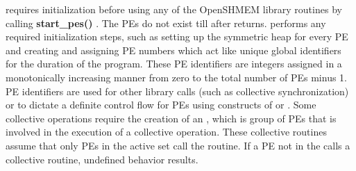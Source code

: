 \openshmem requires initialization before using any of the OpenSHMEM library
routines by calling \textbf{start\_pes()} .%
The \ac{PE}s do not exist till after  returns.  performs any required initialization steps, such as setting up the symmetric heap for every \ac{PE} and creating and assigning \ac{PE} numbers which act like unique global identifiers for the duration of the program. These \ac{PE} identifiers are integers assigned in a monotonically increasing manner from zero to the total number of \ac{PE}s minus 1. \ac{PE} identifiers are used for other \openshmem library calls (such as collective synchronization) or to dictate a definite control flow for \ac{PE}s using constructs of \Clang{} or \Fortran{}. Some collective operations require the creation of an \activeset, which is  group of \ac{PE}s that is involved in the execution of a collective operation. These collective routines assume that only \ac{PE}s in the active set call the routine. If a \ac{PE} not in the \activeset{} calls a \openshmem{} collective routine, undefined  behavior results.

